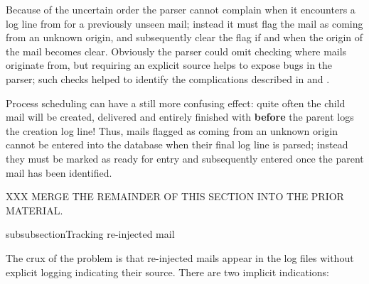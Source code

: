 Because of the uncertain order the parser cannot complain when it
encounters a log line from  for a previously unseen mail;
instead it must flag the mail as coming from an unknown origin, and
subsequently clear the flag if and when the origin of the mail becomes
clear.  Obviously the parser could omit checking where mails originate
from, but requiring an explicit source helps to expose bugs in the parser;
such checks helped to identify the complications described in
 and .

Process scheduling can have a still more confusing effect: quite often the
child mail will be created, delivered and entirely finished with
\textbf{before} the parent logs the creation log line!  Thus, mails flagged
as coming from an unknown origin cannot be entered into the database when
their final log line is parsed; instead they must be marked as ready for
entry and subsequently entered once the parent mail has been identified.

XXX MERGE THE REMAINDER OF THIS SECTION INTO THE PRIOR MATERIAL\@.

subsubsection{Tracking re-injected mail}

\label{tracking re-injected mail}

The crux of the problem is that re-injected mails appear in the log files
without explicit logging indicating their source.  There are two implicit
indications:

